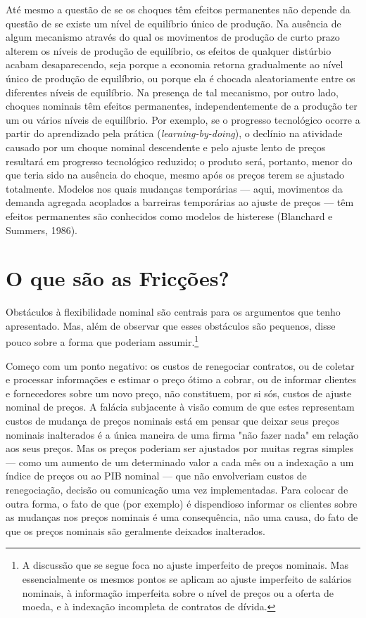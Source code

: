 \documentclass[12pt]{article}
\begin{document}
{Até mesmo a questão de se os choques têm efeitos permanentes não depende da questão de se existe um nível de equilíbrio único de produção. Na ausência de algum mecanismo através do qual os movimentos de produção de curto prazo alterem os níveis de produção de equilíbrio, os efeitos de qualquer distúrbio acabam desaparecendo, seja porque a economia retorna gradualmente ao nível único de produção de equilíbrio, ou porque ela é chocada aleatoriamente entre os diferentes níveis de equilíbrio. Na presença de tal mecanismo, por outro lado, choques nominais têm efeitos permanentes, independentemente de a produção ter um ou vários níveis de equilíbrio. Por exemplo, se o progresso tecnológico ocorre a partir do aprendizado pela prática (\textit{learning-by-doing}), o declínio na atividade causado por um choque nominal descendente e pelo ajuste lento de preços resultará em progresso tecnológico reduzido; o produto será, portanto, menor do que teria sido na ausência do choque, mesmo após os preços terem se ajustado totalmente. Modelos nos quais mudanças temporárias — aqui, movimentos da demanda agregada acoplados a barreiras temporárias ao ajuste de preços — têm efeitos permanentes são conhecidos como modelos de histerese (Blanchard e Summers, 1986).

\section*{O que são as Fricções?}

Obstáculos à flexibilidade nominal são centrais para os argumentos que tenho apresentado. Mas, além de observar que esses obstáculos são pequenos, disse pouco sobre a forma que poderiam assumir.\footnote{A discussão que se segue foca no ajuste imperfeito de preços nominais. Mas essencialmente os mesmos pontos se aplicam ao ajuste imperfeito de salários nominais, à informação imperfeita sobre o nível de preços ou a oferta de moeda, e à indexação incompleta de contratos de dívida.}

Começo com um ponto negativo: os custos de renegociar contratos, ou de coletar e processar informações e estimar o preço ótimo a cobrar, ou de informar clientes e fornecedores sobre um novo preço, não constituem, por si sós, custos de ajuste nominal de preços. A falácia subjacente à visão comum de que estes representam custos de mudança de preços nominais está em pensar que deixar seus preços nominais inalterados é a única maneira de uma firma "não fazer nada" em relação aos seus preços. Mas os preços poderiam ser ajustados por muitas regras simples — como um aumento de um determinado valor a cada mês ou a indexação a um índice de preços ou ao PIB nominal — que não envolveriam custos de renegociação, decisão ou comunicação uma vez implementadas. Para colocar de outra forma, o fato de que (por exemplo) é dispendioso informar os clientes sobre as mudanças nos preços nominais é uma consequência, não uma causa, do fato de que os preços nominais são geralmente deixados inalterados.

}
\end{document}
